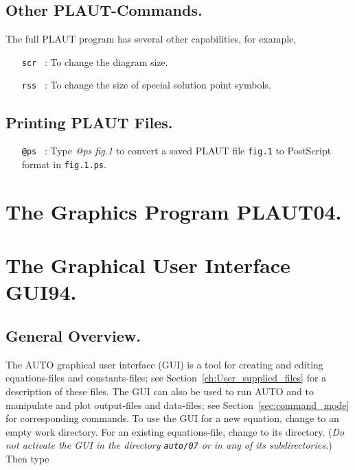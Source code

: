 \documentclass[12pt]{report}
\begin{document}
\section{ Other {\cal PLAUT}-Commands.} \label{sec:Other_PLAUT_commands}
The full {\cal PLAUT} program has several other capabilities, for example,

\begin{itemize}
\item[\tt scr]~:  To change the diagram size.
\item[\tt rss]~:  To change the size of special solution point symbols.
\end{itemize}


\section{ Printing {\cal PLAUT} Files.} \label{sec:Printing_PLAUT_files}
\begin{itemize}
\item[\tt @ps]~:
  Type {\it @ps fig.1} to convert a saved {\cal PLAUT} file {\tt fig.1} 
  to {\cal PostScript} format
  in {\tt fig.1.ps}.
\end{itemize}

 
\chapter{ The Graphics Program PLAUT04.} \label{ch:PLAUT04}

\chapter{ The Graphical User Interface GUI94.} \label{ch:GUI}
\section{ General Overview.} \label{sec:GUI_Overview}
The {\cal AUTO} graphical user interface (GUI) is a tool
for creating and editing equations-files and constants-files;
see Section~\ref{ch:User_supplied_files}
 for a description of these files.
The GUI can also be used to run {\cal AUTO} and to manipulate and plot
output-files and data-files; 
see Section~\ref{sec:command_mode} for corresponding commands.
To use the GUI for a new equation, change to an empty work directory.
For an existing equations-file, change to its directory.
({\it Do not activate the GUI in the directory {\tt auto/07} 
or in any of its subdirectories.})
Then type 
\end{document}
